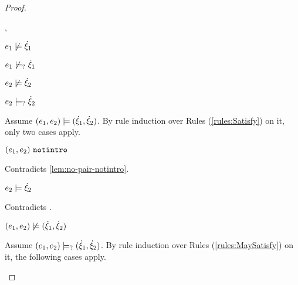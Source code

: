\begin{proof}
\begin{byCases}
\begin{byCases}
\begin{byCases}
        \item[\cnotsatisfyormay{e_1}{\hxi_1},\cmaysatisfy{e_2}{\hxi_2}]
            \begin{pfsteps*}
            \item $e_1 \not\models \dot{\xi}_1$  
            \item $e_1 \not\models_{?} \dot{\xi}_1$  
            \item $e_2 \not\models \dot{\xi}_2$  
            \item $e_2 \models_{?} \dot{\xi}_2$  
            \end{pfsteps*}
            Assume $(e_1 , e_2) \models (\dot{\xi}_1 , \dot{\xi}_2)$. By rule induction over Rules (\ref{rules:Satisfy}) on it, only two cases apply. 
           \begin{byCases}
            \item[\text{(\ref{rule:CSNotIntroPair})}]
                \begin{pfsteps*}
                \item $(e_1 , e_2) ~\mathtt{notintro}$ 
                \end{pfsteps*}
                Contradicts \autoref{lem:no-pair-notintro}.
            \item[\text{(\ref{rule:CSPair})}]
                \begin{pfsteps*}
                \item $e_2 \models \dot{\xi}_2$ 
                \end{pfsteps*}
                Contradicts .
            \end{byCases}
            \begin{pfsteps*}
            \item $(e_1 , e_2) \not\models (\dot{\xi}_1 , \dot{\xi}_2)$  
            \end{pfsteps*}
            Assume $(e_1 , e_2) \models_{?} (\dot{\xi}_1 , \dot{\xi}_2)$. By rule induction over Rules (\ref{rules:MaySatisfy}) on it, the following cases apply.
            \begin{byCases}
            \item[\text{(\ref{rule:CMSNotIntro})}]

\end{byCases}
\end{byCases}
\end{byCases}
\end{byCases}
\end{proof}
